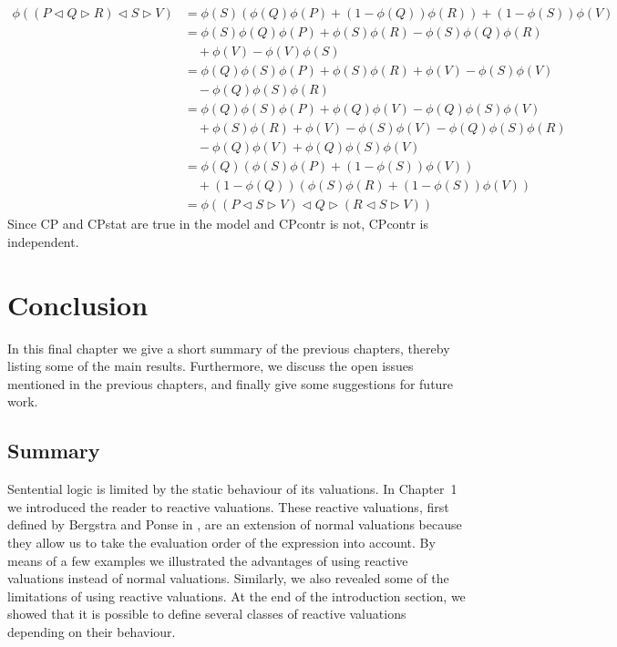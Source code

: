 \documentclass[a4paper,twoside,openright]{report}
\newcommand{\lef}{\ensuremath{\triangleleft}}
\newcommand{\rig}{\ensuremath{\triangleright}}
\begin{document}
\begin{align*}
\phi((P\lef Q\rig R)\lef S\rig V)
&=\phi(S)(\phi(Q)\phi(P)+(1-\phi(Q))\phi(R))+(1-\phi(S))\phi(V)\\
&=\phi(S)\phi(Q)\phi(P)+\phi(S)\phi(R)-\phi(S)\phi(Q)\phi(R)\\
&\quad +\phi(V)-\phi(V)\phi(S)\\
&=\phi(Q)\phi(S)\phi(P)+\phi(S)\phi(R)+\phi(V)-\phi(S)\phi(V)\\
&\quad -\phi(Q)\phi(S)\phi(R)\\
&=\phi(Q)\phi(S)\phi(P)+\phi(Q)\phi(V)-\phi(Q)\phi(S)\phi(V)\\
&\quad +\phi(S)\phi(R)+\phi(V)-\phi(S)\phi(V)-\phi(Q)\phi(S)\phi(R)\\
&\quad -\phi(Q)\phi(V)+\phi(Q)\phi(S)\phi(V)\\
&=\phi(Q)(\phi(S)\phi(P)+(1-\phi(S))\phi(V))\\
&\quad +(1-\phi(Q))(\phi(S)\phi(R)+(1-\phi(S))\phi(V))\\
&=\phi((P\lef S\rig V)\lef Q\rig(R\lef S\rig V))
\end{align*}
Since CP and CPstat are true in the model and CPcontr is not, CPcontr is independent.



\chapter{Conclusion}
In this final chapter we give a short summary of the previous chapters, thereby listing some of the main results. Furthermore, we discuss the open issues mentioned in the previous chapters, and finally give some suggestions for future work.

\section{Summary}
Sentential logic is limited by the static behaviour of its valuations. In Chapter~1 we introduced the reader to reactive valuations. These reactive valuations, first defined by Bergstra and Ponse in \cite{main}, are an extension of normal valuations because they allow us to take the evaluation order of the expression into account. By means of a few examples we illustrated the advantages of using reactive valuations instead of normal valuations. Similarly, we also revealed some of the limitations of using reactive valuations. At the end of the introduction section, we showed that it is possible to define several classes of reactive valuations depending on their behaviour.
\end{document}

